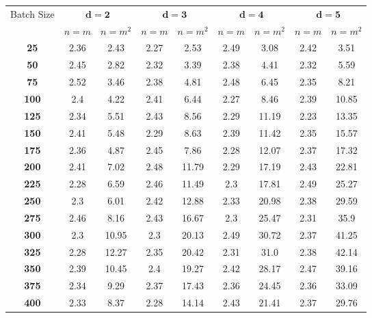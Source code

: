 \documentclass[a4paper, 11pt]{article}
\begin{document}
\begin{table}[H]
    \centering
    \begin{tabular}{|c||cc|cc|cc|cc|}
        \hline
        \multirow{2}{*}{Batch Size} & \multicolumn{2}{c|}{$\mathbf{d = 2}$} & \multicolumn{2}{c|}{$\mathbf{d = 3}$} & \multicolumn{2}{c|}{$\mathbf{d = 4}$} & \multicolumn{2}{c|}{$\mathbf{d = 5}$} \\ \cline{2-9}
        & $n = m$ & $n = m^2$ & $n = m$ & $n = m^2$ & $n = m$ & $n = m^2$ & $n = m$ & $n = m^2$\\ \hline
        \textbf{25} & 2.36 & 2.43 & 2.27 & 2.53 & 2.49 & 3.08 & 2.42 & 3.51 \\ \hline
        \textbf{50} & 2.45 & 2.82 & 2.32 & 3.39 & 2.38 & 4.41 & 2.32 & 5.59 \\ \hline
        \textbf{75} & 2.52 & 3.46 & 2.38 & 4.81 & 2.48 & 6.45 & 2.35 & 8.21 \\ \hline
        \textbf{100} & 2.4 & 4.22 & 2.41 & 6.44 & 2.27 & 8.46 & 2.39 & 10.85 \\ \hline
        \textbf{125} & 2.34 & 5.51 & 2.43 & 8.56 & 2.29 & 11.19 & 2.23 & 13.35 \\ \hline
        \textbf{150} & 2.41 & 5.48 & 2.29 & 8.63 & 2.39 & 11.42 & 2.35 & 15.57 \\ \hline
        \textbf{175} & 2.36 & 4.87 & 2.45 & 7.86 & 2.28 & 12.07 & 2.37 & 17.32 \\ \hline
        \textbf{200} & 2.41 & 7.02 & 2.48 & 11.79 & 2.29 & 17.19 & 2.43 & 22.81 \\ \hline
        \textbf{225} & 2.28 & 6.59 & 2.46 & 11.49 & 2.3 & 17.81 & 2.49 & 25.27 \\ \hline
        \textbf{250} & 2.3 & 6.01 & 2.42 & 12.88 & 2.33 & 20.98 & 2.38 & 29.59 \\ \hline
        \textbf{275} & 2.46 & 8.16 & 2.43 & 16.67 & 2.3 & 25.47 & 2.31 & 35.9 \\ \hline
        \textbf{300} & 2.3 & 10.95 & 2.3 & 20.13 & 2.49 & 30.72 & 2.37 & 41.25 \\ \hline
        \textbf{325} & 2.28 & 12.27 & 2.35 & 20.42 & 2.31 & 31.0 & 2.38 & 42.14 \\ \hline
        \textbf{350} & 2.39 & 10.45 & 2.4 & 19.27 & 2.42 & 28.17 & 2.47 & 39.16 \\ \hline
        \textbf{375} & 2.34 & 9.29 & 2.37 & 17.43 & 2.36 & 24.45 & 2.36 & 33.09 \\ \hline
        \textbf{400} & 2.33 & 8.37 & 2.28 & 14.14 & 2.43 & 21.41 & 2.37 & 29.76 \\ \hline

\end{tabular}
\end{table}
\end{document}
